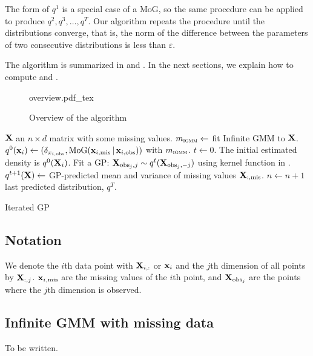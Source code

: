 \documentclass[letterpaper]{article}
\newcommand{\vbar}{\,|\,}
\newcommand{\vx}{{\bf x}}
\newcommand{\vX}{{\bf X}}
\begin{document}
The form of $q^1$ is a special case of a \ac{MoG}, so the same procedure can be
applied to produce $q^2, q^3,\dots,q^T$. Our algorithm repeats the procedure
until the distributions converge, that is, the norm of the difference between
the parameters of two consecutive distributions is less than $\varepsilon$.

The algorithm is summarized in  and .
In the next sections, we explain how to compute  and
.

\begin{figure}[hbtp]
{overview.pdf_tex}
\caption{Overview of the algorithm\label{fig:overview}}
\end{figure}

\begin{algorithm}[h]
\begin{algorithmic}
 ${\bf X}$ an $n \times d$ matrix with some missing values.
\State $m_\textsc{igmm} \gets$ fit Infinite \ac{GMM} to $\vX$.
\State $q^0(\vx_i) \gets (\delta_{x_{i,\text{obs}}}, \text{MoG}(\vx_{i,\text{mis}} \vbar \vx_{i,\text{obs}}))$ with $m_\textsc{igmm}$.
\EndFor
\State $t \gets 0$. The initial estimated density is $q^0(\vX_i)$.
\While{$q^t(\vX)$ hasn't yet converged}
    \State Fit a \ac{GP}: $\vX_{\text{obs}_j, j} \sim q^t(\vX_{\text{obs}_j, -j})$
     using kernel function in .
    \State $q^{t+1}(\vX) \gets $ \ac{GP}-predicted mean and variance of missing values
    $\vX_{:,\text{mis}}$.
    \State $n \gets n + 1$
  \EndFor
\EndWhile
\State \Return last predicted distribution, $q^T$.
\end{algorithmic}
\caption{Iterated \acl{GP}}
\label{alg:main-summary}
\end{algorithm}


\subsection{Notation}

We denote the $i$th data point with ${\bf X}_{i,:}$ or $\vx_i$ and the $j$th
dimension of all points by ${\bf X}_{:,j}$. $\vx_{i,\text{mis}}$ are the missing
values of the $i$th point, and $\vX_{\text{obs}_j}$ are the points where the
$j$th dimension is observed.

\subsection{Infinite \ac{GMM} with missing data}
To be written.
\end{document}
